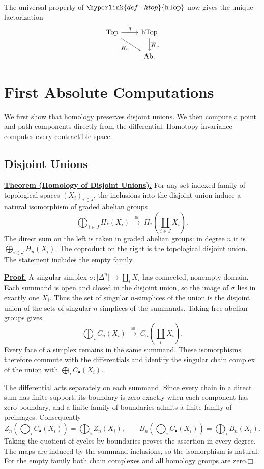 \documentclass[11pt]{article}
\newcommand{\facehead}[1]{\par\Needspace{4\baselineskip}\subsection{#1}}
\begin{document}
The universal property of $\hyperlink{def:htop}{\mathrm{hTop}}$ now gives the unique factorization
\[
\begin{tikzcd}
\mathrm{Top}\arrow[r,"q"]\arrow[dr,"H_n"']&\mathrm{hTop}\arrow[d,"\overline H_n"]\\
&\mathrm{Ab}.
\end{tikzcd}
\]

\section{First Absolute Computations}
We first show that homology preserves disjoint unions. We then compute a point and path components directly from the differential. Homotopy invariance computes every contractible space.

\facehead{Disjoint Unions}
\hypertarget{disjoint-theorem}{}\textbf{\hyperlink{disjoint-proof}{Theorem (Homology of Disjoint Unions).}} For any set-indexed family of topological spaces $(X_i)_{i\in J}$, the inclusions into the disjoint union induce a natural isomorphism of graded abelian groups
\[
\bigoplus_{i\in J}H_*(X_i)\ \xrightarrow{\ \cong\ }\ H_*\!\left(\coprod_{i\in J}X_i\right).
\]
The direct sum on the left is taken in graded abelian groups: in degree $n$ it is $\bigoplus_{i\in J}H_n(X_i)$. The coproduct on the right is the topological disjoint union. The statement includes the empty family.

\hypertarget{disjoint-proof}{}\textbf{\hyperlink{disjoint-theorem}{Proof.}} A singular simplex $\sigma:\lvert\Delta^n\rvert\to\coprod_iX_i$ has connected, nonempty domain. Each summand is open and closed in the disjoint union, so the image of $\sigma$ lies in exactly one $X_i$. Thus the set of singular $n$-simplices of the union is the disjoint union of the sets of singular $n$-simplices of the summands. Taking free abelian groups gives
\[
\bigoplus_iC_n(X_i)\ \xrightarrow{\ \cong\ }\ C_n\!\left(\coprod_iX_i\right).
\]
Every face of a simplex remains in the same summand. These isomorphisms therefore commute with the differentials and identify the singular chain complex of the union with $\bigoplus_iC_\bullet(X_i)$.

The differential acts separately on each summand. Since every chain in a direct sum has finite support, its boundary is zero exactly when each component has zero boundary, and a finite family of boundaries admits a finite family of preimages. Consequently
\[
Z_n\!\left(\bigoplus_iC_\bullet(X_i)\right)=\bigoplus_i Z_n(X_i),
\qquad
B_n\!\left(\bigoplus_iC_\bullet(X_i)\right)=\bigoplus_i B_n(X_i).
\]
Taking the quotient of cycles by boundaries proves the assertion in every degree. The maps are induced by the summand inclusions, so the isomorphism is natural. For the empty family both chain complexes and all homology groups are zero.\hfill$\mdlgwhtsquare$
\end{document}

